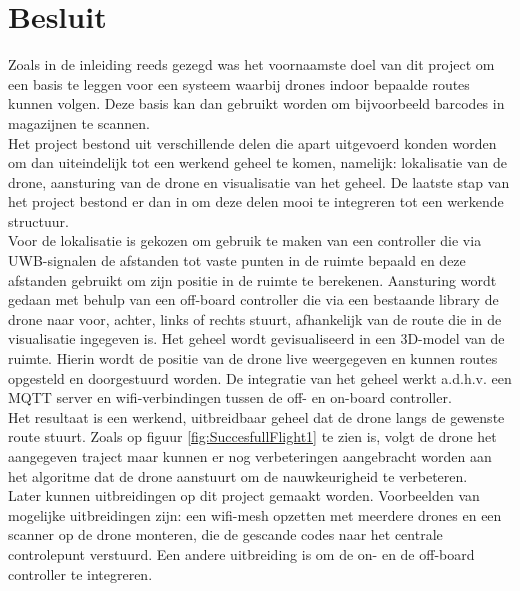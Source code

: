 \chapter*{Besluit}
Zoals in de inleiding reeds gezegd was het voornaamste doel van dit project om een basis te leggen voor een systeem waarbij drones indoor bepaalde routes kunnen volgen. Deze basis kan dan gebruikt worden om bijvoorbeeld barcodes in magazijnen te scannen.\\

Het project bestond uit verschillende delen die apart uitgevoerd konden worden om dan uiteindelijk tot een werkend geheel te komen, namelijk: lokalisatie van de drone, aansturing van de drone en visualisatie van het geheel. De laatste stap van het project bestond er dan in om deze delen mooi te integreren tot een werkende structuur.\\

Voor de lokalisatie is gekozen om gebruik te maken van een controller die via UWB-signalen de afstanden tot vaste punten in de ruimte bepaald en deze afstanden gebruikt om zijn positie in de ruimte te berekenen. Aansturing wordt gedaan met behulp van een off-board controller die via een bestaande library de drone naar voor, achter, links of rechts stuurt, afhankelijk van de route die in de visualisatie ingegeven is. Het geheel wordt gevisualiseerd in een 3D-model van de ruimte. Hierin wordt de positie van de drone live weergegeven en kunnen routes opgesteld en doorgestuurd worden. De integratie van het geheel werkt a.d.h.v. een MQTT server en wifi-verbindingen tussen de off- en on-board controller.\\

Het resultaat is een werkend, uitbreidbaar geheel dat de drone langs de gewenste route stuurt. Zoals op figuur \ref{fig:SuccesfullFlight1} te zien is, volgt de drone het aangegeven traject maar kunnen er nog verbeteringen aangebracht worden aan het algoritme dat de drone aanstuurt om de nauwkeurigheid te verbeteren.\\

Later kunnen uitbreidingen op dit project gemaakt worden. Voorbeelden van mogelijke uitbreidingen zijn: een wifi-mesh opzetten met meerdere drones en een scanner op de drone monteren, die de gescande codes naar het centrale controlepunt verstuurd. Een andere uitbreiding is om de on- en de off-board controller te integreren.\\